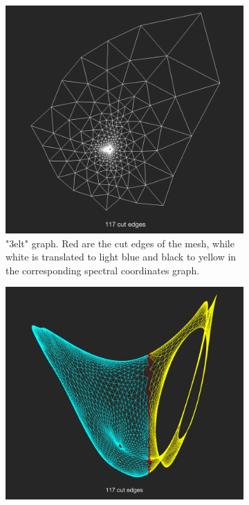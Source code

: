 \documentclass[unicode,11pt,a4paper,oneside,numbers=endperiod,openany]{scrartcl}
\begin{document}
\begin{figure}[H]
\centering
        \begin{subfigure}[b]{0.475\textwidth}   
            \centering 
            \includegraphics[width=\textwidth]{3elt.png}
            {{\small "3elt" graph. Red are the cut edges of the mesh, while white is translated to light blue and black to yellow in the corresponding spectral coordinates graph.}}    
        \end{subfigure}
        \hfill
        \begin{subfigure}[b]{0.475\textwidth}   
            \centering 
            \includegraphics[width=\textwidth]{12.png}

\end{subfigure}
\end{figure}
\end{document}

